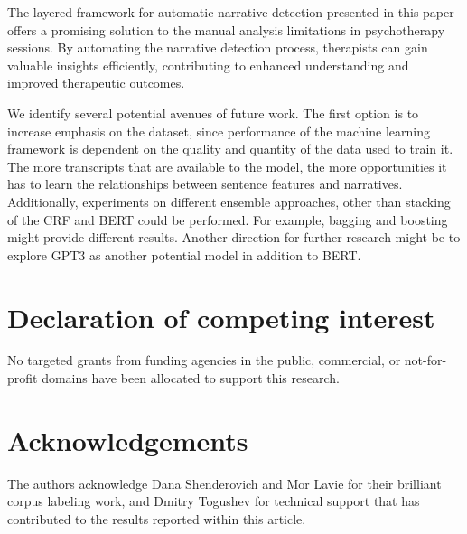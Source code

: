 \documentclass[preprint,12pt]{elsarticle}
\begin{document}

The layered framework for automatic narrative detection presented in this paper offers a promising solution to the manual analysis limitations in psychotherapy sessions. By automating the narrative detection process, therapists can gain valuable insights efficiently, contributing to enhanced understanding and improved therapeutic outcomes.

We identify several potential avenues of future work. The first option is to increase emphasis on the dataset, since performance of the machine learning framework is dependent on the quality and quantity of the data used to train it. The more transcripts that are available to the model, the more opportunities it has to learn the relationships between sentence features and narratives. Additionally, experiments on different ensemble approaches, other than stacking of the CRF and BERT could be performed. For example, bagging and boosting might provide different results. Another direction for further research might be to explore GPT3 as another potential model in addition to BERT. 

\section*{Declaration of competing interest}

No targeted grants from funding agencies in the public, commercial, or not-for-profit domains have been allocated to support this research.

\section*{Acknowledgements}

The authors acknowledge Dana Shenderovich and Mor Lavie for their brilliant corpus labeling work, and Dmitry Togushev for technical support that has contributed to the results reported within this article.
\end{document}
